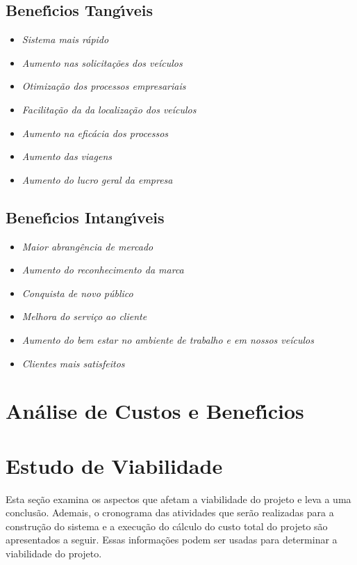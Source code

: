 \subsection{Benef\'{\i}cios Tang\'{\i}veis}
\begin{itemize}

      \item \textit{Sistema mais rápido}
      \item \textit{Aumento nas solicitações dos veículos}
      \item \textit{Otimização dos processos empresariais}
      \item \textit{Facilitação da da localização dos veículos}
      \item \textit{Aumento na eficácia dos processos}
      \item \textit{Aumento das viagens}
      \item \textit{Aumento do lucro geral da empresa}



\end{itemize}

\subsection{Benef\'{\i}cios Intang\'{\i}veis}
\begin{itemize}

      \item \textit{Maior abrangência de mercado}
      \item \textit{Aumento do reconhecimento da marca}
      \item \textit{Conquista de novo público}
      \item \textit{Melhora do serviço ao cliente}
      \item \textit{Aumento do bem estar no ambiente de trabalho e em nossos veículos}
      \item \textit{Clientes mais satisfeitos}



\end{itemize}

\section{An\'{a}lise de Custos e Benef\'{\i}cios}





\section{Estudo de Viabilidade}
Esta seção examina os aspectos que afetam a viabilidade do projeto e leva a uma conclusão. Ademais, o cronograma das atividades que serão realizadas para a construção do sistema e a execução do cálculo do custo total do projeto são apresentados a seguir. Essas informações podem ser usadas para determinar a viabilidade do projeto.

